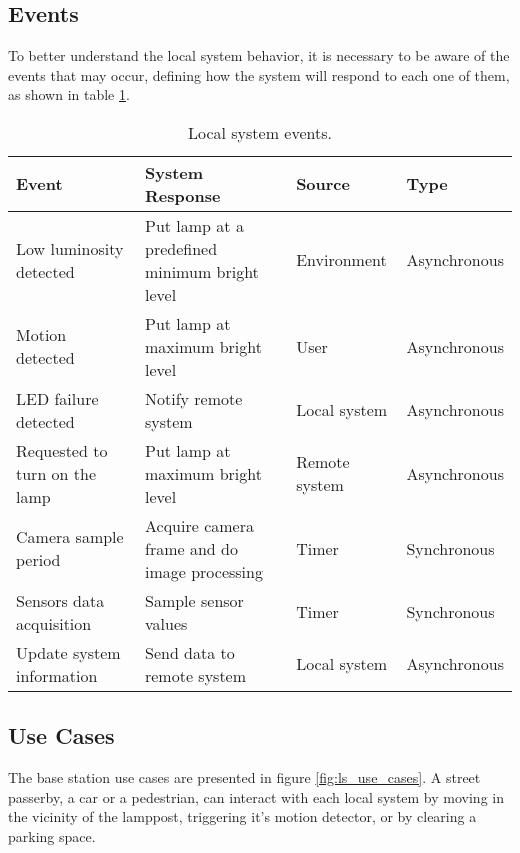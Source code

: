 \subsection{Events}
To better understand the local system behavior, it is necessary to be aware of the events that may occur, defining how the system will respond to each one of them, as shown in table \ref{table:ls_events}. 

\begin{table}[ht]
	\centering
	\resizebox{\columnwidth}{!}
	{

	\begin{tabular}{|m{3cm}|m{5cm}|m{2.4cm}|m{2.4cm}|}
		\hline
		\textbf{Event} & \textbf{System Response} & \textbf{Source} & \textbf{Type}\\
		\hline\hline
		Low luminosity detected & Put lamp at a predefined minimum bright level & Environment & Asynchronous\\
		\hline
		
		Motion detected & Put lamp at maximum bright level & User & Asynchronous\\
		\hline
		
		LED failure detected & Notify remote system & Local system & Asynchronous\\
		\hline
		
		Requested to turn on the lamp & Put lamp at maximum bright level & Remote system & Asynchronous\\
		\hline
		
		Camera sample period & Acquire camera frame and do image processing & Timer & Synchronous\\
		\hline
		
		Sensors data acquisition & Sample sensor values & Timer & Synchronous\\
		\hline
		
		Update system information & Send data to remote system & Local system & Asynchronous\\
		\hline
	\end{tabular}
	}
	\caption{Local system events.}
	\label{table:ls_events}
\end{table}

\clearpage
\subsection{Use Cases}
The base station use cases are presented in figure \ref{fig:ls_use_cases}. A street passerby, a car or a pedestrian, can interact with each local system by moving in the vicinity of the lamppost, triggering it's motion detector, or by clearing a parking space.

